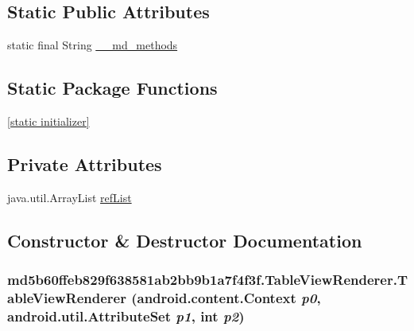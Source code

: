 \subsection*{Static Public Attributes}
\begin{CompactItemize}
\item 
static final String \hyperlink{classmd5b60ffeb829f638581ab2bb9b1a7f4f3f_1_1_table_view_renderer_bfca855cef125ff9e66a6690bfef09b8}{\_\-\_\-md\_\-methods}
\end{CompactItemize}
\subsection*{Static Package Functions}
\begin{CompactItemize}
\item 
\hyperlink{classmd5b60ffeb829f638581ab2bb9b1a7f4f3f_1_1_table_view_renderer_9a8e5ca95f8d81d63f025a408f8d84c0}{\mbox{[}static initializer\mbox{]}}
\end{CompactItemize}
\subsection*{Private Attributes}
\begin{CompactItemize}
\item 
java.util.ArrayList \hyperlink{classmd5b60ffeb829f638581ab2bb9b1a7f4f3f_1_1_table_view_renderer_98f8a583ce568ff85385a44cc922c5d1}{refList}
\end{CompactItemize}


\subsection{Constructor \& Destructor Documentation}
\hypertarget{classmd5b60ffeb829f638581ab2bb9b1a7f4f3f_1_1_table_view_renderer_68af3619c35003818e23669dc9cef59c}{
\subsubsection[{TableViewRenderer}]{\setlength{\rightskip}{0pt plus 5cm}md5b60ffeb829f638581ab2bb9b1a7f4f3f.TableViewRenderer.TableViewRenderer (android.content.Context {\em p0}, \/  android.util.AttributeSet {\em p1}, \/  int {\em p2})}}
\label{classmd5b60ffeb829f638581ab2bb9b1a7f4f3f_1_1_table_view_renderer_68af3619c35003818e23669dc9cef59c}


